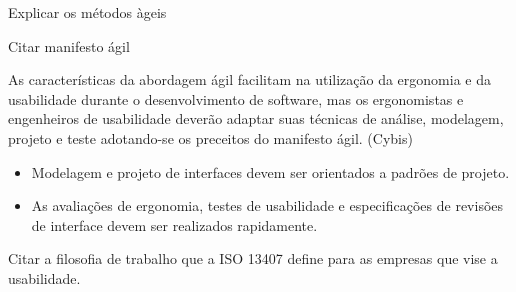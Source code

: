 Explicar os métodos àgeis

Citar manifesto ágil

As características da abordagem ágil facilitam na utilização da ergonomia e da usabilidade durante o desenvolvimento de software, mas os ergonomistas e engenheiros de usabilidade deverão adaptar suas técnicas de análise, modelagem, projeto e teste adotando-se os preceitos do manifesto ágil. (Cybis)

\begin{itemize}
\item Modelagem e projeto de interfaces devem ser orientados a padrões de projeto.
\item As avaliações de ergonomia, testes de usabilidade e especificações de revisões de interface devem ser realizados rapidamente.
\end{itemize}

Citar a filosofia de trabalho que a  ISO 13407 define para as empresas que vise a usabilidade.
